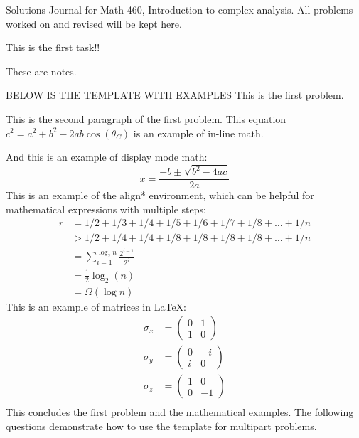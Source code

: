 \documentclass{cisXXX} %
\begin{document}
\maketitle

\begin{notes}
    Solutions Journal for Math 460, Introduction to complex analysis. All problems worked on and revised will be kept here.
\end{notes}

\Task
This is the first task!!
\begin{notes}[task]
  These are notes.
\end{notes}










\newpage
BELOW IS THE TEMPLATE WITH EXAMPLES
\HWproblem
This is the first problem.

This is the second paragraph of the first problem. This equation $c^2 = a^2 + b^2 - 2ab \cos(\theta_C)$ is an example of in-line math.

And this is an example of display mode math:
$$x = \frac{-b \pm \sqrt{b^2 - 4ac}}{2a}$$
This is an example of the align* environment, which can be helpful for mathematical expressions with multiple steps:
\begin{align*}
r &= 1/2 + 1/3 + 1/4 + 1/5 + 1/6 + 1/7 + 1/8 + \ldots + 1/n\\
&> 1/2 + 1/4 + 1/4 + 1/8 + 1/8 + 1/8 + 1/8 + \ldots + 1/n\\
&= \sum_{i = 1}^{\log_2 n} \frac{2^{i - 1}}{2^i}\\
&= \frac{1}{2} \log_2 (n)\\ 
&= \Omega(\log n)
\end{align*}
This is an example of matrices in \LaTeX:
\begin{align*}
	\sigma_x &=
		\begin{pmatrix}
		0 & 1 \\
		1 & 0
		\end{pmatrix} \\
	\sigma_y &=
		\begin{pmatrix}
		0 & -i \\
		i & 0
		\end{pmatrix} \\
	\sigma_z &=
		\begin{pmatrix}
		1 & 0 \\
		0 & -1
		\end{pmatrix} \\
\end{align*}
This concludes the first problem and the mathematical examples. The following questions demonstrate how to use the template for multipart problems.
\end{document}
